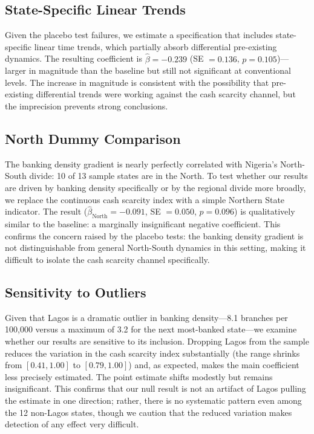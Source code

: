 \documentclass[12pt]{article}
\begin{document}
\subsection{State-Specific Linear Trends}

Given the placebo test failures, we estimate a specification that includes state-specific linear time trends, which partially absorb differential pre-existing dynamics. The resulting coefficient is $\hat{\beta} = -0.239$ (SE $= 0.136$, $p = 0.105$)---larger in magnitude than the baseline but still not significant at conventional levels. The increase in magnitude is consistent with the possibility that pre-existing differential trends were working against the cash scarcity channel, but the imprecision prevents strong conclusions.

\subsection{North Dummy Comparison}

The banking density gradient is nearly perfectly correlated with Nigeria's North-South divide: 10 of 13 sample states are in the North. To test whether our results are driven by banking density specifically or by the regional divide more broadly, we replace the continuous cash scarcity index with a simple Northern State indicator. The result ($\hat{\beta}_{\text{North}} = -0.091$, SE $= 0.050$, $p = 0.096$) is qualitatively similar to the baseline: a marginally insignificant negative coefficient. This confirms the concern raised by the placebo tests: the banking density gradient is not distinguishable from general North-South dynamics in this setting, making it difficult to isolate the cash scarcity channel specifically.

\subsection{Sensitivity to Outliers}

Given that Lagos is a dramatic outlier in banking density---8.1 branches per 100,000 versus a maximum of 3.2 for the next most-banked state---we examine whether our results are sensitive to its inclusion. Dropping Lagos from the sample reduces the variation in the cash scarcity index substantially (the range shrinks from $[0.41, 1.00]$ to $[0.79, 1.00]$) and, as expected, makes the main coefficient less precisely estimated. The point estimate shifts modestly but remains insignificant. This confirms that our null result is not an artifact of Lagos pulling the estimate in one direction; rather, there is no systematic pattern even among the 12 non-Lagos states, though we caution that the reduced variation makes detection of any effect very difficult.
\end{document}
